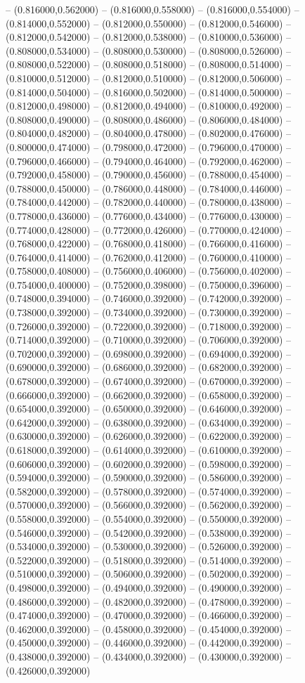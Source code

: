-- (0.816000,0.562000) -- (0.816000,0.558000) -- (0.816000,0.554000) -- (0.814000,0.552000) -- (0.812000,0.550000) -- (0.812000,0.546000) -- (0.812000,0.542000) -- (0.812000,0.538000) -- (0.810000,0.536000) -- (0.808000,0.534000) -- (0.808000,0.530000) -- (0.808000,0.526000) -- (0.808000,0.522000) -- (0.808000,0.518000) -- (0.808000,0.514000) -- (0.810000,0.512000) -- (0.812000,0.510000) -- (0.812000,0.506000) -- (0.814000,0.504000) -- (0.816000,0.502000) -- (0.814000,0.500000) -- (0.812000,0.498000) -- (0.812000,0.494000) -- (0.810000,0.492000) -- (0.808000,0.490000) -- (0.808000,0.486000) -- (0.806000,0.484000) -- (0.804000,0.482000) -- (0.804000,0.478000) -- (0.802000,0.476000) -- (0.800000,0.474000) -- (0.798000,0.472000) -- (0.796000,0.470000) -- (0.796000,0.466000) -- (0.794000,0.464000) -- (0.792000,0.462000) -- (0.792000,0.458000) -- (0.790000,0.456000) -- (0.788000,0.454000) -- (0.788000,0.450000) -- (0.786000,0.448000) -- (0.784000,0.446000) -- (0.784000,0.442000) -- (0.782000,0.440000) -- (0.780000,0.438000) -- (0.778000,0.436000) -- (0.776000,0.434000) -- (0.776000,0.430000) -- (0.774000,0.428000) -- (0.772000,0.426000) -- (0.770000,0.424000) -- (0.768000,0.422000) -- (0.768000,0.418000) -- (0.766000,0.416000) -- (0.764000,0.414000) -- (0.762000,0.412000) -- (0.760000,0.410000) -- (0.758000,0.408000) -- (0.756000,0.406000) -- (0.756000,0.402000) -- (0.754000,0.400000) -- (0.752000,0.398000) -- (0.750000,0.396000) -- (0.748000,0.394000) -- (0.746000,0.392000) -- (0.742000,0.392000) -- (0.738000,0.392000) -- (0.734000,0.392000) -- (0.730000,0.392000) -- (0.726000,0.392000) -- (0.722000,0.392000) -- (0.718000,0.392000) -- (0.714000,0.392000) -- (0.710000,0.392000) -- (0.706000,0.392000) -- (0.702000,0.392000) -- (0.698000,0.392000) -- (0.694000,0.392000) -- (0.690000,0.392000) -- (0.686000,0.392000) -- (0.682000,0.392000) -- (0.678000,0.392000) -- (0.674000,0.392000) -- (0.670000,0.392000) -- (0.666000,0.392000) -- (0.662000,0.392000) -- (0.658000,0.392000) -- (0.654000,0.392000) -- (0.650000,0.392000) -- (0.646000,0.392000) -- (0.642000,0.392000) -- (0.638000,0.392000) -- (0.634000,0.392000) -- (0.630000,0.392000) -- (0.626000,0.392000) -- (0.622000,0.392000) -- (0.618000,0.392000) -- (0.614000,0.392000) -- (0.610000,0.392000) -- (0.606000,0.392000) -- (0.602000,0.392000) -- (0.598000,0.392000) -- (0.594000,0.392000) -- (0.590000,0.392000) -- (0.586000,0.392000) -- (0.582000,0.392000) -- (0.578000,0.392000) -- (0.574000,0.392000) -- (0.570000,0.392000) -- (0.566000,0.392000) -- (0.562000,0.392000) -- (0.558000,0.392000) -- (0.554000,0.392000) -- (0.550000,0.392000) -- (0.546000,0.392000) -- (0.542000,0.392000) -- (0.538000,0.392000) -- (0.534000,0.392000) -- (0.530000,0.392000) -- (0.526000,0.392000) -- (0.522000,0.392000) -- (0.518000,0.392000) -- (0.514000,0.392000) -- (0.510000,0.392000) -- (0.506000,0.392000) -- (0.502000,0.392000) -- (0.498000,0.392000) -- (0.494000,0.392000) -- (0.490000,0.392000) -- (0.486000,0.392000) -- (0.482000,0.392000) -- (0.478000,0.392000) -- (0.474000,0.392000) -- (0.470000,0.392000) -- (0.466000,0.392000) -- (0.462000,0.392000) -- (0.458000,0.392000) -- (0.454000,0.392000) -- (0.450000,0.392000) -- (0.446000,0.392000) -- (0.442000,0.392000) -- (0.438000,0.392000) -- (0.434000,0.392000) -- (0.430000,0.392000) -- (0.426000,0.392000) 